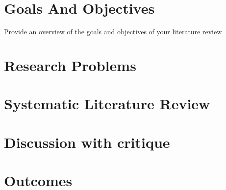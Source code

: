 \documentclass{article}
\begin{document}
\section{Goals And Objectives}
Provide an overview of the goals and objectives of your literature review

\section{Research Problems}

\section{Systematic Literature Review}

\section{Discussion with critique}

\section {Outcomes}



\end{document}
